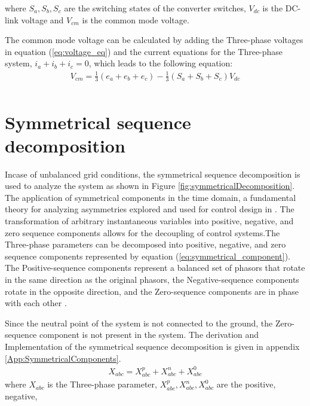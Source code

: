 where $S_a, S_b, S_c$ are the switching states of the converter switches, $V_{dc}$ is the DC-link voltage and
$V_{cm}$ is the common mode voltage.\par
The common mode voltage can be calculated by adding the Three-phase voltages in equation (\ref{eq:voltage_eq})
and the current equations for the Three-phase system, $i_a + i_b + i_c = 0$, which leads to the following
equation:
\begin{equation}
    \begin{gathered}
        V_{cm} =\frac{1}{3}(e_a + e_b + e_c) -\frac{1}{3}(S_a + S_b + S_c) V_{dc}\\
    \end{gathered}
    \label{eq:common_mode_voltage_calc}
\end{equation}
\section{Symmetrical sequence decomposition}
Incase of unbalanced grid conditions, the symmetrical sequence decomposition is used to analyze
the system as shown in Figure \ref{fig:symmetricalDecomposition}. The application of symmetrical components in 
the time domain, a fundamental theory for analyzing asymmetries explored and used for control design in \cite{alathamneh2022,paap2000,XinhuiWu}.
The transformation of arbitrary instantaneous variables into positive, negative, and zero sequence components
allows for the decoupling of control systems.The Three-phase parameters can be decomposed into positive, negative,
and zero sequence components represented by equation (\ref{eq:symmetrical_component}). The Positive-sequence components
represent a balanced set of phasors that rotate in the same direction as the original phasors, the Negative-sequence
components rotate in the opposite direction, and the Zero-sequence components are in phase with each other \cite{XinhuiWu}.\par
Since the neutral point of the system is not connected to the ground, the Zero-sequence component is not present in the system.
The derivation and Implementation of the symmetrical sequence decomposition is given in appendix \ref{App:SymmetricalComponents}.
\begin{equation}
    \begin{gathered}
        X_{abc} = X^{p}_{abc} + X^{n}_{abc} + X^{0}_{abc}
    \end{gathered}
    \label{eq:symmetrical_component}
\end{equation}
where $X_{abc}$ is the Three-phase parameter, $X^{p}_{abc}, X^{n}_{abc}, X^{0}_{abc}$ are the positive, negative,
